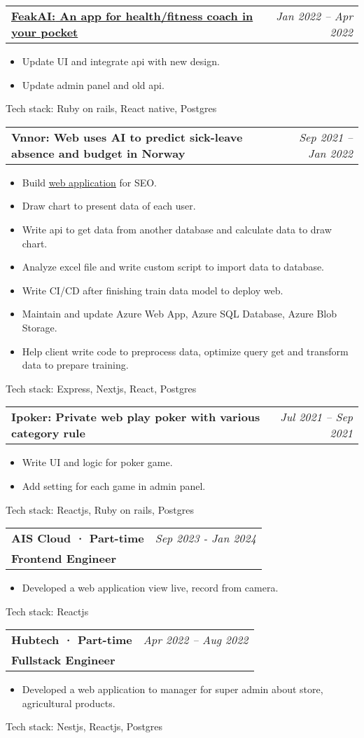 \documentclass[letterpaper,11pt]{article}
\makeatletter
\newcommand{\resumeItem}[1]{
  \item\small{
    {#1 \vspace{-2pt}}
  }
}
\newcommand{\resumeSubheadingWithoutProject}[4]{
  \vspace{-2pt}\item
    \begin{tabular*}{0.97\textwidth}[t]{l@{\extracolsep{\fill}}r}
      \textbf{\Large#1} & \textit{#2} \\
      \textbf{\small#3} & \textit{\small #4} \\
    \end{tabular*}\vspace{-7pt}
}
\newcommand{\resumeSubheadingProject}[2]{
  \vspace{-2pt}\item
    \begin{tabular*}{0.97\textwidth}[t]{l@{\extracolsep{\fill}}r}
      \textbf{\small#1} & \textit{\small #2} \\
    \end{tabular*}\vspace{-7pt}
}
\newcommand{\resumeSubheadingProjectWithLink}[4]{
  \vspace{-2pt}\item
    \begin{tabular*}{0.97\textwidth}[t]{l@{\extracolsep{\fill}}r}
      \href{#1}{\textbf{\underline{#2}:{#3}}} & \textit{\small #4} \\
    \end{tabular*}\vspace{-7pt}
}
\newcommand{\resumeLink}[2]{
  \href{#1}{\underline{#2}}
}
\newcommand{\resumeSubSubheading}[2]{
    \item
    \begin{tabular*}{0.97\textwidth}{l@{\extracolsep{\fill}}r}
      \textit{\small#1} & \textit{\small #2} \\
    \end{tabular*}\vspace{-7pt}
}
\newcommand{\resumeSubHeadingListEnd}{\end{itemize}}
\newcommand{\resumeItemListStart}{\begin{itemize}}
\newcommand{\resumeItemListEnd}{\end{itemize}\vspace{-5pt}}
\makeatother
\begin{document}
\resumeSubheadingProjectWithLink
{https://play.google.com/store/apps/details?id=ai.feak\&hl=en}
{FeakAI}
{ An app for health/fitness coach in your pocket}{Jan 2022 -- Apr 2022}
\resumeItemListStart
\resumeItem{ Update UI and integrate api with new design.}
\resumeItem{ Update admin panel and old api.}
\resumeItemListEnd
{Tech stack:}{ Ruby on rails, React native, Postgres}

\resumeSubheadingProject
{Vnnor: Web uses AI to predict sick-leave absence and budget in Norway}{Sep 2021 -- Jan 2022}
\resumeItemListStart
\resumeItem{ Build\resumeLink{https://www.synplan.ai/}{web application}for SEO.}
\resumeItem{ Draw chart to present data of each user.}
\resumeItem{ Write api to get data from another database and calculate data to draw chart.}
\resumeItem{ Analyze excel file and write custom script to import data to database.}
\resumeItem{ Write CI/CD after finishing train data model to deploy web.}
\resumeItem{ Maintain and update Azure Web App, Azure SQL Database, Azure Blob Storage.}
\resumeItem{ Help client write code to preprocess data, optimize query get and transform data to prepare training.}
\resumeItemListEnd
{Tech stack:}{ Express, Nextjs, React, Postgres}

\resumeSubheadingProject
{Ipoker: Private web play poker with various category rule}{Jul 2021 -- Sep 2021}
\resumeItemListStart
\resumeItem{ Write UI and logic for poker game.}
\resumeItem{ Add setting for each game in admin panel.}
\resumeItemListEnd
{Tech stack:}{ Reactjs, Ruby on rails, Postgres}


\resumeSubheadingWithoutProject
{AIS Cloud · Part-time}{Sep 2023 - Jan 2024}
{Frontend Engineer}{}
\resumeItemListStart
\resumeItem{Developed a web application view live, record from camera.}
\resumeItemListEnd
{Tech stack:}{ Reactjs }

\resumeSubheadingWithoutProject
{Hubtech · Part-time}{Apr 2022 -- Aug 2022}
{Fullstack Engineer}{}
\resumeItemListStart
\resumeItem{Developed a web application to manager for super admin about store, agricultural products.}
\resumeItemListEnd
{Tech stack:}{ Nestjs, Reactjs, Postgres}
\end{document}
